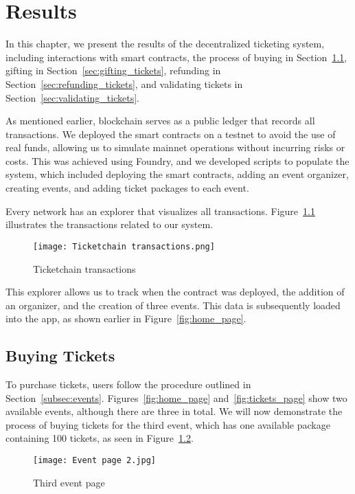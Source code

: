 \chapter{Results}\label{ch:results}

In this chapter, we present the results of the decentralized ticketing system,
including interactions with smart contracts, the process of buying in
Section~\ref{sec:buying_tickets}, gifting in Section~\ref{sec:gifting_tickets},
refunding in Section~\ref{sec:refunding_tickets}, and validating tickets in
Section~\ref{sec:validating_tickets}.

As mentioned earlier, blockchain serves as a public ledger that records all
transactions. We deployed the smart contracts on a testnet to avoid the use of
real funds, allowing us to simulate mainnet operations without incurring risks
or costs. This was achieved using Foundry, and we developed scripts to populate
the system, which included deploying the smart contracts, adding an event
organizer, creating events, and adding ticket packages to each event.

Every network has an explorer that visualizes all transactions.
Figure~\ref{fig:ticketchain_transactions} illustrates the transactions related
to our system.
\begin{figure}[H]
    \texttt{[image: Ticketchain transactions.png]}
    \centering
    \caption{Ticketchain transactions}\label{fig:ticketchain_transactions}
\end{figure}

This explorer allows us to track when the contract was deployed, the addition
of an organizer, and the creation of three events. This data is subsequently
loaded into the app, as shown earlier in Figure~\ref{fig:home_page}.

\section{Buying Tickets}\label{sec:buying_tickets}

To purchase tickets, users follow the procedure outlined in
Section~\ref{subsec:events}. Figures~\ref{fig:home_page}
and~\ref{fig:tickets_page} show two available events, although there are three
in total. We will now demonstrate the process of buying tickets for the third
event, which has one available package containing 100 tickets, as seen in
Figure~\ref{fig:buy_tickets_event}.

\begin{figure}[H]
    \texttt{[image: Event page 2.jpg]}
    \centering
    \caption{Third event page}\label{fig:buy_tickets_event}
\end{figure}

